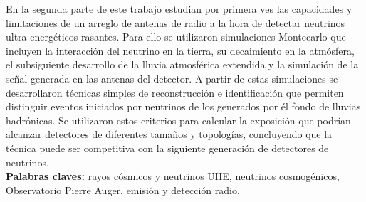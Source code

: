 \begin{titlepage}
En la segunda parte de este trabajo estudian por primera ves las capacidades y limitaciones de un arreglo de antenas de radio a la hora de detectar neutrinos ultra energéticos rasantes.
Para ello se utilizaron simulaciones Montecarlo que incluyen la interacción del neutrino en la tierra, su decaimiento en la atmósfera, el subsiguiente desarrollo de la lluvia atmosférica extendida y la simulación de la señal generada en las antenas del detector.
A partir de estas simulaciones se desarrollaron técnicas simples de reconstrucción e identificación que permiten distinguir eventos iniciados por neutrinos de los generados por él fondo de lluvias hadrónicas. 
Se utilizaron estos criterios para calcular la exposición que podrían alcanzar detectores de diferentes tamaños y topologías, concluyendo que la técnica puede ser competitiva con la siguiente generación de detectores de neutrinos.
\\[0.2cm]

\noindent
\textbf{Palabras claves: } rayos cósmicos y neutrinos UHE, neutrinos cosmogénicos, Observatorio Pierre Auger, emisión y detección radio.\\

\end{titlepage}